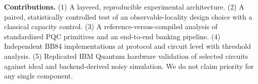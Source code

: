 \documentclass[runningheads]{llncs}
\begin{document}
\textbf{Contributions.} (1) A layered, reproducible experimental architecture. (2) A paired, statistically controlled test of an observable-locality design choice with a classical capacity control. (3) A reference-versus-compiled analysis of standardized PQC primitives and an end-to-end banking pipeline. (4) Independent BB84 implementations at protocol and circuit level with threshold analysis. (5) Replicated IBM Quantum hardware validation of selected circuits against ideal and backend-derived noisy simulation. We do not claim priority for any single component.
















\end{document}
